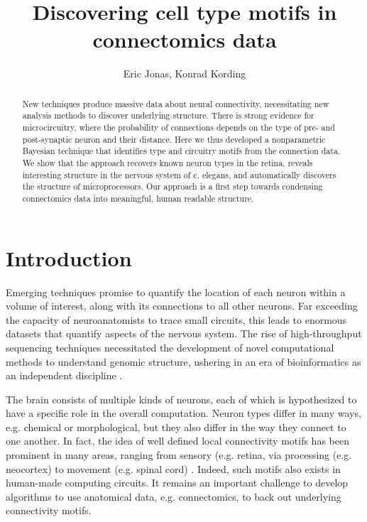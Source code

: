 \documentclass{article}
\title{Discovering cell type motifs in connectomics data}
\author{Eric Jonas, Konrad Kording}
\begin{document}
\maketitle


\begin{abstract}
  New techniques produce massive data about neural connectivity,
  necessitating new analysis methods to discover underlying
  structure. There is strong evidence for microcircuitry, where the
  probability of connections depends on the type of pre- and
  post-synaptic neuron and their distance. Here we thus developed a
  nonparametric Bayesian technique that identifies type and circuitry
  motifs from the connection data. We show that the approach recovers
  known neuron types in the retina, reveals interesting structure in
  the nervous system of c. elegans, and automatically discovers the
  structure of microprocessors. Our approach is a first step towards
  condensing connectomics data into meaningful, human readable
  structure.
\end{abstract}

\section*{Introduction}
Emerging techniques \autocite{Lichtman, Zador, Denk} promise to
quantify the location of each neuron within a volume of interest,
along with its connections to all other neurons. Far exceeding the
capacity of neuroanatomists to trace small circuits, this leads to
enormous datasets that quantify aspects of the nervous system. The
rise of high-throughput sequencing techniques necessitated the
development of novel computational methods to understand genomic
structure, ushering in an era of bioinformatics as an independent
discipline \autocite{}.


The brain consists of multiple kinds of neurons, each of which is
hypothesized to have a specific role in the overall
computation. Neuron types differ in many ways, e.g. chemical or
morphological, but they also differ in the way they connect to one
another. In fact, the idea of well defined local connectivity motifs
has been prominent in many areas, ranging from sensory (e.g. retina,
\autocite{} via processing (e.g. neocortex) to movement (e.g. spinal cord)
\autocite{}. Indeed, such motifs also exists in human-made computing
circuits. It remains an important challenge to develop algorithms to
use anatomical data, e.g. connectomics, to back out underlying
connectivity motifs.
\end{document}
